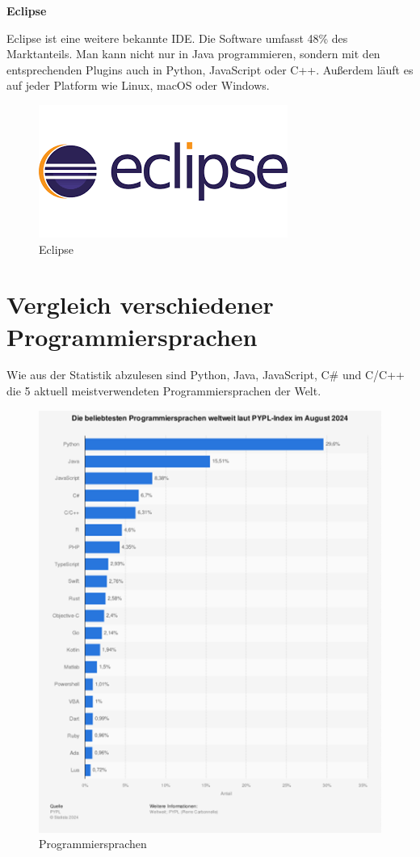 \textbf{Eclipse}

Eclipse ist eine weitere bekannte IDE. Die Software umfasst 48\% des Marktanteils. Man kann nicht nur in Java programmieren, sondern mit den entsprechenden Plugins auch in Python, JavaScript oder C++. Außerdem läuft es auf jeder Platform wie Linux, macOS oder Windows. \parencite{Eclipse}

\begin{figure}[H]
	\centering
	\includegraphics[width=0.5\linewidth]{images/eclipse.png}
	\caption[Eclipse]{Eclipse}
	\label{fig:Eclipse}
\end{figure}

\section {Vergleich verschiedener Programmiersprachen}
Wie aus der Statistik abzulesen sind Python, Java, JavaScript, C\# und C/C++ die 5 aktuell meistverwendeten Programmiersprachen der Welt. \parencite{meistProgrammiersprachen}


\begin{figure}[H]
	\centering
	\includegraphics[width=0.7\linewidth]{images/Programmiersprachen.png}
	\caption[Programmiersprachen]{Programmiersprachen}
	\label{fig:Programmiersprachen}
\end{figure}

